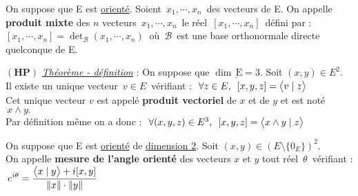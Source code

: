 \vspace{1.3cm}

On suppose que E est \underline{orienté}. Soient \(\,x_1,\cdots,x_n\,\) des vecteurs de E. On appelle \textbf{produit mixte} des $n$ vecteurs \(\,x_1,\cdots,x_n\,\) le réel \(\,[x_1,\cdots,x_n]\,\) défini par :\vspace{0.1cm} \\
\([x_1,\cdots,x_n]=\det_\mathcal{B}(x_1,\cdots,x_n)\ \) où \(\,\mathcal{B}\,\) est une base orthonormale directe quelconque de E.

\vspace{1.5cm}

\(\left(\mathbf{H}\mathbf{P}\right)\) \underline{\emph{Théorème - définition}} : On suppose que \(\underline{\dim\,\text{E}=3}\). Soit \((x,y)\in E^2\).\vspace{0.1cm}\\
Il existe un unique vecteur \(\,v\in E\,\) vérifiant : \(\;\forall z \in E,\ \, [x,y,z]=\bigl\langle v\mid z \bigr\rangle\)\\
Cet unique vecteur $v$ est appelé \textbf{produit vectoriel} de $x$ et de $y$ et est noté \(\,x\wedge y.\)\vspace{0.1cm}\\
Par définition même on a donc : \(\ \forall(x,y,z)\in E^3,\ \, [x,y,z]=\psm{x\wedge y}{z}\)

\vspace{1.5cm}

On suppose que E est \underline{orienté} de \underline{dimension 2}. Soit \((x,y)\in \left(E\setminus \{0_E\}\right)^2\).\vspace{-0.1cm}\\
On appelle \textbf{mesure de l'angle orienté} des vecteurs $x$ et $y$ tout réel $\,\theta\,$ vérifiant : \(\,\displaystyle e^{i\theta}=\frac{\bigl\langle x\mid y \bigr\rangle+i[x,y]}{\left\lVert x\right\rVert\cdot \left\lVert y\right\rVert}\)

\vspace{1.3cm}

